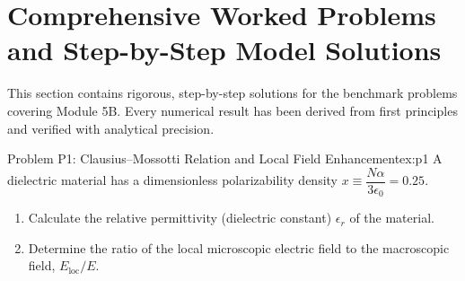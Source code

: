 \documentclass[11pt,a4paper]{article}
\begin{document}
\section{Comprehensive Worked Problems and Step-by-Step Model Solutions}
\label{sec:worked_problems}

This section contains rigorous, step-by-step solutions for the benchmark problems covering Module 5B. Every numerical result has been derived from first principles and verified with analytical precision.

\begin{examplebox}{Problem P1: Clausius--Mossotti Relation and Local Field Enhancement}{ex:p1}
A dielectric material has a dimensionless polarizability density $x \equiv \dfrac{N\alpha}{3\epsilon_0} = 0.25$.
\begin{enumerate}[label=(\alph*), leftmargin=*]
    \item Calculate the relative permittivity (dielectric constant) $\epsilon_r$ of the material.
    \item Determine the ratio of the local microscopic electric field to the macroscopic field, $E_{\text{loc}}/E$.
\end{enumerate}
\end{examplebox}
\end{document}
